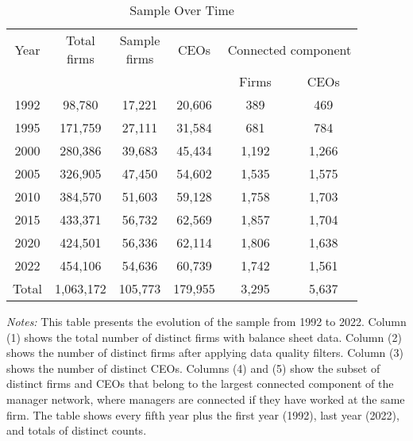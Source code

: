 \begin{table}[htbp]
\centering
\caption{Sample Over Time}
\label{tab:sample}
\begin{tabular}{*{6}{c}}
\toprule
Year & \shortstack{Total\\firms} & \shortstack{Sample\\firms} & CEOs & \multicolumn{2}{c}{Connected component} \\
\cmidrule(lr){5-6}
 & & & & Firms & CEOs \\
\midrule
1992 &       98,780 &       17,221 &       20,606 &          389 &          469 \\
1995 &      171,759 &       27,111 &       31,584 &          681 &          784 \\
2000 &      280,386 &       39,683 &       45,434 &        1,192 &        1,266 \\
2005 &      326,905 &       47,450 &       54,602 &        1,535 &        1,575 \\
2010 &      384,570 &       51,603 &       59,128 &        1,758 &        1,703 \\
2015 &      433,371 &       56,732 &       62,569 &        1,857 &        1,704 \\
2020 &      424,501 &       56,336 &       62,114 &        1,806 &        1,638 \\
2022 &      454,106 &       54,636 &       60,739 &        1,742 &        1,561 \\
\midrule
Total &    1,063,172 &      105,773 &      179,955 &        3,295 &        5,637 \\
\bottomrule
\end{tabular}
\begin{minipage}{12cm}
\footnotesize
\textit{Notes:} This table presents the evolution of the sample from 1992 to 2022. Column (1) shows the total number of distinct firms with balance sheet data. Column (2) shows the number of distinct firms after applying data quality filters. Column (3) shows the number of distinct CEOs. Columns (4) and (5) show the subset of distinct firms and CEOs that belong to the largest connected component of the manager network, where managers are connected if they have worked at the same firm. The table shows every fifth year plus the first year (1992), last year (2022), and totals of distinct counts. \end{minipage}
\end{table}
